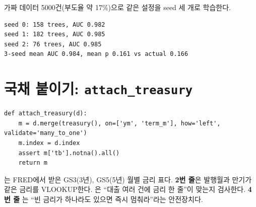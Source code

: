 \begin{workout}
가짜 데이터 5000건(부도율 약 17\%)으로 같은 설정을 seed 세 개로 학습한다.
\begin{lstlisting}[style=out]
seed 0: 158 trees, AUC 0.982
seed 1: 182 trees, AUC 0.985
seed 2: 76 trees, AUC 0.985
3-seed mean AUC 0.984, mean p 0.161 vs actual 0.166
\end{lstlisting}
\end{workout}

\section{국채 붙이기: \texttt{attach\_treasury}}
\begin{lstlisting}
def attach_treasury(d):
    m = d.merge(treasury(), on=['ym', 'term_m'], how='left', validate='many_to_one')
    m.index = d.index
    assert m['tb'].notna().all()
    return m
\end{lstlisting}
는 FRED에서 받은 GS3(3년), GS5(5년) 월별 금리 표다. \textbf{2번 줄}은 발행월과 만기가 같은 금리를 VLOOKUP한다. 은 ``대출 여러 건에 금리 한 줄''이 맞는지 검사한다. \textbf{4번 줄} 는 ``빈 금리가 하나라도 있으면 즉시 멈춰라''라는 안전장치다.
